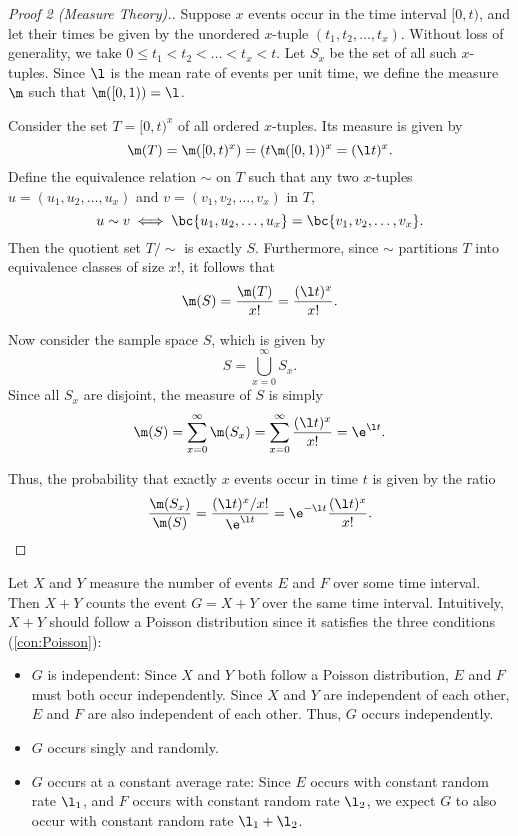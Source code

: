\begin{proof}[Proof 2 (Measure Theory).]
    Suppose $x$ events occur in the time interval $[0, t)$, and let their times be given by the unordered $x$-tuple $(t_1, t_2, \dots, t_x)$. Without loss of generality, we take $0 \leq t_1 < t_2 < \dots < t_x < t$. Let $S_x$ be the set of all such $x$-tuples. Since $\l$ is the mean rate of events per unit time, we define the measure $\m$ such that $\m([0, 1)) = \l$.

    Consider the set $T = [0, t)^x$ of all ordered $x$-tuples. Its measure is given by \[\m(T) = \m([0, t)^x) = (t \m([0, 1))^x = (\l t)^x.\] Define the equivalence relation $\sim$ on $T$ such that any two $x$-tuples $u = (u_1, u_2, \dots, u_x)$ and $v = (v_1, v_2, \dots, v_x)$ in $T$, \[u \sim v \iff \bc{u_1, u_2, \dots, u_x} = \bc{v_1, v_2, \dots, v_x}.\] Then the quotient set $T / \sim$ is exactly $S$. Furthermore, since $\sim$ partitions $T$ into equivalence classes of size $x!$, it follows that \[\m(S) = \frac{\m(T)}{x!} = \frac{(\l t)^x}{x!}.\]
    
    Now consider the sample space $S$, which is given by \[S = \bigcup_{x = 0}^\infty S_x.\] Since all $S_x$ are disjoint, the measure of $S$ is simply \[\m(S) = \sum_{x = 0}^\infty \m(S_x) = \sum_{x = 0}^\infty \frac{(\l t)^x}{x!} = \e^{\l t}.\]

    Thus, the probability that exactly $x$ events occur in time $t$ is given by the ratio \[\frac{\m(S_x)}{\m(S)} = \frac{(\l t)^x / x!}{\e^{\l t}} = \e^{-\l t} \frac{(\l t)^x}{x!}.\]
\end{proof}

Let $X$ and $Y$ measure the number of events $E$ and $F$ over some time interval. Then $X + Y$ counts the event $G = X + Y$ over the same time interval. Intuitively, $X + Y$ should follow a Poisson distribution since it satisfies the three conditions (\ref{con:Poisson}):

\begin{itemize}
    \item $G$ is independent: Since $X$ and $Y$ both follow a Poisson distribution, $E$ and $F$ must both occur independently. Since $X$ and $Y$ are independent of each other, $E$ and $F$ are also independent of each other. Thus, $G$ occurs independently.
    \item $G$ occurs singly and randomly.
    \item $G$ occurs at a constant average rate: Since $E$ occurs with constant random rate $\l_1$, and $F$ occurs with constant random rate $\l_2$, we expect $G$ to also occur with constant random rate $\l_1 + \l_2$.
\end{itemize}

